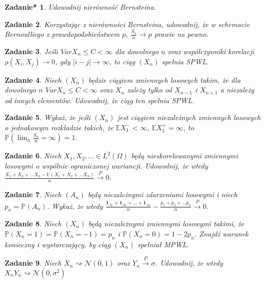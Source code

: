 \documentclass{mwart}
\newtheorem{zd}{Zadanie}
\newtheorem{zdt}[zd]{Zadanie*}
\begin{document}
\begin{zdt}
Udowodnij nierówność Bernsteina.
\end{zdt}

\begin{zd}
Korzystając z nierówności Bernsteina, udowodnij, że w schemacie Bernoulliego z prawdopodobieństwem $p$, $\frac{S_n}{n}\to p$ prawie na pewno.
\end{zd}

\begin{zd}
Jeśli $VarX_n \leq C < \infty$ dla dowolnego $n$ oraz współczynniki korelacji $\rho (X_i, X_j) \to 0$, gdy $|i-j|\to \infty$, to ciąg $(X_n)$ spełnia SPWL.
\end{zd}

\begin{zd}
Niech $(X_n)$ będzie ciągiem zmiennych losowych takim, że dla dowolnego $n$ $VarX_n \leq C < \infty$ oraz $X_n$ zależy tylko od $X_{n-1}$ i $X_{n+1}$ a niezależy od innych elementów. Udowodnij, że ciąg ten spełnia SPWL.
\end{zd}

\begin{zd}
Wykaż, że jeśli $(X_n)$ jest ciągiem niezależnych zmiennych losowych o jednakowym rozkładzie takich, że $\mathbb{E}X_1^- < \infty$, $\mathbb{E}X_1^+ = \infty$, to $\mathbb{P}\left(\lim_n\frac{S_n}{n} = \infty\right) = 1$.
\end{zd}

\begin{zd}
Niech $X_1, X_2, \dots \in L^2\left(\Omega \right)$ będą nieskorelowanymi zmiennymi losowymi o wspólnie ograniczonej wariancji. Udowodnij, że wtedy $\frac{X_1+X_2 + \dots  X_n - \mathbb{E}\left(X_1+X_2 + \dots  X_n\right)}{n} \xrightarrow{P} 0$.
\end{zd}

\begin{zd}
Niech $(A_n)$ będą niezależnymi zdarzeniami losowymi i niech $p_n = \mathbb{P}(A_n)$. Wykaż, że wtedy $\frac{\pmb{1}_{A_1} + \pmb{1}_{A_2} + \dots + \pmb{1}_{A_n}}{n} - \frac{p_1 + p_2 + \dots p_n}{n} \xrightarrow{P} 0$.
\end{zd}

\begin{zd}
Niech $(X_n)$ będą niezależnymi zmiennymi losowymi takimi, że $\mathbb{P}(X_n=1)=\mathbb{P}(X_n=-1) = p_n$ i $\mathbb{P}(X_n=0)=1-2p_n$. Znajdź warunek konieczny i wystarczający, by ciąg $(X_n)$ spełniał MPWL.
\end{zd}

\begin{zd}
Niech $X_n \rightsquigarrow \mathcal{N}(0, 1)$ oraz $Y_n \xrightarrow{P} \sigma$. Udowodnij, że wtedy $X_nY_n \rightsquigarrow \mathcal{N}(0, \sigma^2)$
\end{zd}
\end{document}

